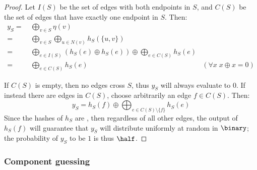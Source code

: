 \begin{proof}
    Let $I(S)$ be the set of edges with both endpoints in $S$, and $C(S)$ be the set of edges that have exactly one endpoint in $S$. Then:
    \begin{align*}
            y_S
        =&\ \bigoplus_{v \in S} \eta(v)                                                         & \\
        =&\ \bigoplus_{v \in S} \bigoplus_{u \in N(v)} h_S(\{u, v\})                            & \\
        =&\ \bigoplus_{e \in I(S)} (h_S(e) \oplus h_S(e)) \oplus \bigoplus_{e \in C(S)} h_S(e)  & \\
        =&\ \bigoplus_{e \in C(S)} h_S(e)                                                       & (\forall x \; x \oplus x = 0)
    \end{align*}

    If $C(S)$ is empty, then no edges cross $S$, thus $y_S$ will always evaluate to $0$. If instead there are edges in $C(S)$, choose arbitrarily an edge $f \in C(S)$. Then:
    \[
        y_S = h_S(f) \oplus \bigoplus_{e \in C(S) \setminus \{f\}} h_S(e)
    \]
    Since the hashes of $h_S$ are \iid{}, then regardless of all other edges, the output of $h_S(f)$ will guarantee that $y_S$ will distribute uniformly at random in $\binary$; the probability of $y_S$ to be $1$ is thus $\half$.
\end{proof}

\subsubsection{Component guessing}

